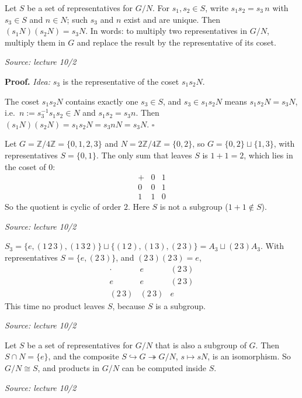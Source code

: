 \documentclass[11pt]{report}
\renewenvironment{proof}[1][Proof]{\noindent\textbf{#1.} }{\hfill$\square$\par\vspace{5pt}}
\newcommand{\srcline}[1]{\par\hfill{\footnotesize\textit{Source: #1}}}
\begin{document}
\begin{propbox}\label{prop:multiplying-through-representatives}
Let $S$ be a set of representatives for $G/N$. For $s_1, s_2 \in S$, write $s_1s_2 = s_3\,n$ with $s_3 \in S$ and $n \in N$; such $s_3$ and $n$ exist and are unique. Then $(s_1N)(s_2N) = s_3N$. In words: to multiply two representatives in $G/N$, multiply them in $G$ and replace the result by the representative of its coset.
\srcline{lecture 10/2}
\end{propbox}

\begin{proof}
\textit{Idea:} $s_3$ is the representative of the coset $s_1s_2N$.\par
The coset $s_1s_2N$ contains exactly one $s_3 \in S$, and $s_3 \in s_1s_2N$ means $s_1s_2N = s_3N$, i.e.\ $n := s_3^{-1}s_1s_2 \in N$ and $s_1s_2 = s_3n$. Then $(s_1N)(s_2N) = s_1s_2N = s_3nN = s_3N$.
\end{proof}

\begin{exbox}\label{ex:z-4z-2z-4z}
Let $G = \mathbb{Z}/4\mathbb{Z} = \{0, 1, 2, 3\}$ and $N = 2\mathbb{Z}/4\mathbb{Z} = \{0, 2\}$, so $G = \{0, 2\} \sqcup \{1, 3\}$, with representatives $S = \{0, 1\}$. The only sum that leaves $S$ is $1 + 1 = 2$, which lies in the coset of $0$:
\[ \begin{array}{c|cc} + & 0 & 1 \\ \hline 0 & 0 & 1 \\ 1 & 1 & 0 \end{array} \]
So the quotient is cyclic of order $2$. Here $S$ is not a subgroup ($1 + 1 \notin S$).
\srcline{lecture 10/2}
\end{exbox}

\begin{exbox}[{$S_3/A_3$}]\label{ex:s3-a3}
$S_3 = \{e, (1\,2\,3), (1\,3\,2)\} \sqcup \{(1\,2), (1\,3), (2\,3)\} = A_3 \sqcup (2\,3)A_3$. With representatives $S = \{e, (2\,3)\}$, and $(2\,3)(2\,3) = e$,
\[ \begin{array}{c|cc} \cdot & e & (2\,3) \\ \hline e & e & (2\,3) \\ (2\,3) & (2\,3) & e \end{array} \]
This time no product leaves $S$, because $S$ is a subgroup.
\srcline{lecture 10/2}
\end{exbox}

\begin{propbox}\label{prop:representatives-forming-subgroup}
Let $S$ be a set of representatives for $G/N$ that is also a subgroup of $G$. Then $S \cap N = \{e\}$, and the composite $S \hookrightarrow G \twoheadrightarrow G/N$, $s \mapsto sN$, is an isomorphism. So $G/N \cong S$, and products in $G/N$ can be computed inside $S$.
\srcline{lecture 10/2}
\end{propbox}
\end{document}
